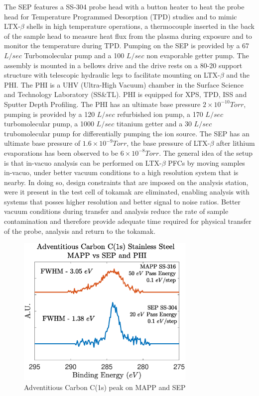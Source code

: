 \documentclass[%
 aip,
 amsmath,amssymb,
 reprint,%
]{revtex4-1}
\begin{document}
The SEP features a SS-304 probe head with a button heater to heat the probe head for Temperature Programmed Desorption (TPD) studies and to mimic LTX-$\beta$ shells in high temperature operations, a thermocouple inserted in the back of the sample head to measure heat flux from the plasma during exposure and to monitor the temperature during TPD. Pumping on the SEP is provided by a 67 $L/sec$ Turbomolecular pump and a 100 $L/sec$ non evaporable getter pump. The assembly is mounted in a bellows drive and the drive rests on a 80-20 support structure with telescopic hydraulic legs to facilitate mounting on LTX-$\beta$ and the PHI. The PHI is a UHV (Ultra-High Vacuum) chamber in the Surface Science and Technology Laboratory (SS\&TL). PHI is equipped for XPS, TPD, ISS and Sputter Depth Profiling. The PHI has an ultimate base pressure $2 \times 10^{-10} Torr$, pumping is provided by a 120 $L/sec$ refurbished ion pump, a 170 $L/sec$ turbomolecular pump, a 1000 $L/sec$ titanium getter and a 30 $L/sec$ trubomolecular pump for differentially pumping the ion source. The SEP has an ultimate base pressure of $1.6 \times 10^{-9} Torr$, the base pressure of LTX-$\beta$ after lithium evaporations has been observed to be $6 \times 10^{-8} Torr$. The general idea of the setup is that in-vacuo analysis can be performed on LTX-$\beta$ PFCs by moving samples in-vacuo, under better vacuum conditions to a high resolution system that is nearby. In doing so, design constraints that are imposed on the analysis station, were it present in the test cell of tokamak are eliminated, enabling analysis with systems that posses higher resolution and better signal to noise ratios. Better vacuum conditions during transfer and analysis reduce the rate of sample contamination and therefore provide adequate time required for physical transfer of the probe, analysis and return to the tokamak. 

\begin{figure}%
\centering
\includegraphics[width=3.37in,keepaspectratio]{C1sMAPP_Comparr_20eV}%
\caption{Adventitious Carbon C(1s) peak on MAPP and SEP}
\end{figure}
\end{document}
